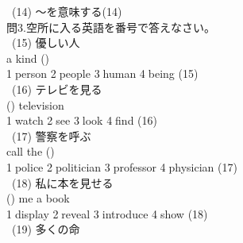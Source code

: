 \documentclass[uplatex]{jsarticle}
\begin{document}
\ (14) 〜を意味する\hspace{\fill}(14)\underline{\hspace{35mm}}\\
\Large 問3.空所に入る英語を番号で答えなさい。\\
\large\ (15) 優しい人\\
\hspace{10mm}a kind (\hspace{10mm})\\
\hspace{10mm}\textcircled{\normalsize1}person \textcircled{\normalsize2}people 
\textcircled{\normalsize3}human \textcircled{\normalsize4}being 
\hspace{\fill}(15)\underline{\hspace{35mm}}\\
\ (16) テレビを見る\\
\hspace{10mm}(\hspace{10mm}) television\\
\hspace{10mm}\textcircled{\normalsize1}watch \textcircled{\normalsize2}see 
\textcircled{\normalsize3}look \textcircled{\normalsize4}find 
\hspace{\fill}(16)\underline{\hspace{35mm}}\\
\ (17) 警察を呼ぶ\\
\hspace{10mm}call the (\hspace{10mm})\\
\hspace{10mm}\textcircled{\normalsize1}police \textcircled{\normalsize2}politician 
\textcircled{\normalsize3}professor \textcircled{\normalsize4}physician 
\hspace{\fill}(17)\underline{\hspace{35mm}}\\
\ (18) 私に本を見せる\\
\hspace{10mm}(\hspace{10mm}) me a book\\
\hspace{10mm}\textcircled{\normalsize1}display \textcircled{\normalsize2}reveal 
\textcircled{\normalsize3}introduce \textcircled{\normalsize4}show 
\hspace{\fill}(18)\underline{\hspace{35mm}}\\
\ (19) 多くの命\\
\end{document}
